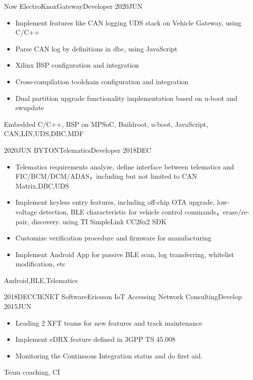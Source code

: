 %
%


 
\begin{experiences}
	
	\experience
	{Now} {ElectroKnox}{Gateway}{Developer}
	{2020JUN }    {
		\begin{itemize}
			\item Implement features like CAN logging  UDS stack on Vehicle Gateway, using C/C++
			\item Parse CAN log by definitions in dbc, using JavaScript
			\item Xilinx BSP configuration and integration
			\item Cross-compilation toolchain configuration and integration
			\item Dual partition upgrade functionality implementation based on u-boot and swupdate
		\end{itemize}
	}
	{Embedded C/C++, BSP on MPSoC, Buildroot, u-boot, JavaScript, CAN,LIN,UDS,DBC,MDF}
	
	\emptySeparator	
	\experience
	{2020JUN} {BYTON}{Telematics}{Developer}
	{2018DEC}    {
		\begin{itemize}
			\item Telematics requirements analyze, define interface between telematics and FIC/BCM/DCM/ADAS，including but not limited to CAN Matrix,DBC,UDS
			\item Implement keyless entry features, including off-chip OTA upgrade, low-voltage detection, BLE characteristic for vehicle control commands，erase/re-pair, discovery. using TI SimpleLink CC26x2 SDK
			\item Customize verification procedure and firmware for manufacturing
			\item Implement Android App for passive BLE scan, log transferring, whitelist modification, etc
		\end{itemize}
	}
	{Android,BLE,Telematics}
	
	\emptySeparator	
	\experience
	{2018DEC}{CIENET Software}{Ericsson IoT Accessing Network Consulting}{Develop}
	{2015JUN} {
		\begin{itemize}
            \item Leading 2 XFT teams for new features and track maintenance
			\item Implement eDRX feature defined in 3GPP TS 45.008
			\item Monitoring the Continuous Integration status and do first aid.
		\end{itemize}
	}
	{Team coaching, CI}
		

\end{experiences}

